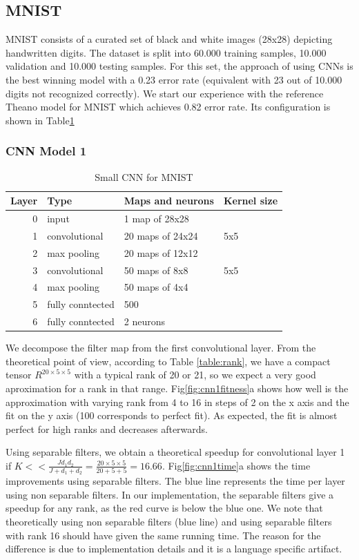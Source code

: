 
\subsection{MNIST}
MNIST consists of a curated set of black and white images (28x28) depicting handwritten digits.
The dataset is split into 60.000 training samples, 10.000 validation and 
10.000 testing samples. For this set, the approach of \cite{DBLP:journals/corr/abs-1202-2745} using CNNs is the best winning model with a 0.23 error rate (equivalent with 23 out of 10.000 digits not recognized correctly).
We start our experience with the reference Theano model for MNIST which achieves 0.82 error rate. Its configuration is shown in Table\ref{fig:cnn1}
\subsubsection{CNN Model 1}
\begin{table}
\centering
\begin{tabular}{@{}rlll@{}}\toprule
Layer & Type & Maps and neurons& Kernel size \\ \midrule
0 & input & 1 map of 28x28 &\\
1& convolutional & 20 maps of 24x24 & 5x5\\
2 & max pooling & 20 maps of 12x12 &  \\
3 & convolutional & 50 maps of 8x8& 5x5 \\
4 & max pooling & 50 maps of 4x4&  \\ 
5 & fully conntected& 500 & \\
6 & fully conntected & 2 neurons & \\ \bottomrule
\end{tabular}
\caption{Small CNN for MNIST}
\label{fig:cnn1}
\end{table}

We decompose the filter map from the first convolutional layer. From the theoretical point of view, according to Table \ref{table:rank}, we have a compact tensor $R^{20\times 5 \times 5}$ with a typical rank of 20 or 21, so we expect a very good aproximation for a rank in that range. 
Fig\ref{fig:cnn1fitness}a shows how well is the approximation with varying rank from 4 to 16 in steps of 2 on the x axis and the fit on the y axis (100 corresponds to perfect fit). As expected, the fit is almost perfect for high ranks and decreases afterwards.

Using separable filters, we obtain a theoretical speedup for convolutional layer 1 if $K<< \frac{Jd_{1}d_{2}}{J +d_{1}+d_{2}} = \frac{20\times 5\times 5}{20 + 5 + 5} = 16.66$. Fig\ref{fig:cnn1time}a shows the time improvements using separable filters. The blue line represents the time per layer using non separable filters. In our implementation, the separable filters give a speedup for any rank, as the red curve is below the blue one. 
We note that theoretically using non separable filters (blue line) and using separable filters with rank 16 should have given the same running time. The reason for the difference is due to implementation details and it is a language specific artifact.

